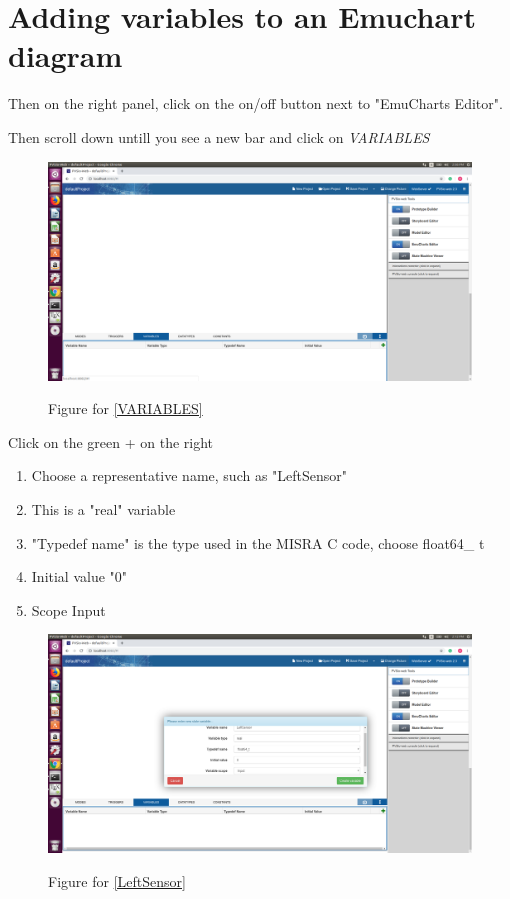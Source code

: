 \documentclass[11pt,a4paper]{../tutorial}
\begin{document}
\section{Adding variables to an Emuchart diagram}
\begin{instructions}
\item Then on the right panel, click on the on/off button next to "EmuCharts Editor".
\item \label{VARIABLES}  Then scroll down untill you see a new bar and click on \emph{VARIABLES}
\begin{figure}[h]
\includegraphics[width=1\textwidth]{figures/VARIABLES.png}
\label{figVARIABLES}
\caption{Figure for  \ref{VARIABLES}}
\end{figure}
\item \label{LeftSensor}Click on the green + on the right
\begin{enumerate}
\item Choose a representative name, such as "LeftSensor"
\item This is a "real" variable
\item "Typedef name" is the type used in the MISRA C code, choose float64\_ t
\item Initial value "0"
\item Scope Input
\end{enumerate}
\begin{figure}[h]
\includegraphics[width=1\textwidth]{figures/LeftSensor.png}
\label{}
\caption{Figure for  \ref{LeftSensor}}
\end{figure}


\end{instructions}
\end{document}
